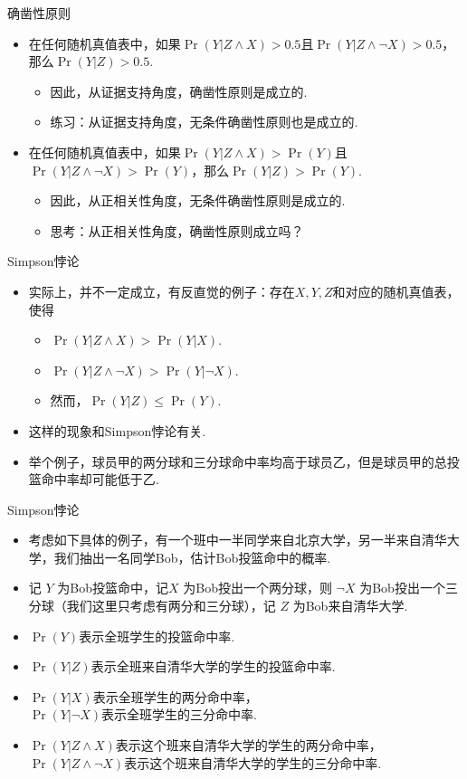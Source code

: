 \begin{frame}{确凿性原则}
\begin{itemize}
    \item 在任何随机真值表中，如果$\Pr(Y|Z\wedge X)>0.5$且$\Pr(Y|Z\wedge\neg X)>0.5$，那么$\Pr(Y|Z)>0.5$.
    \begin{itemize}
        \item 因此，从证据支持角度，确凿性原则是成立的.
        \item 练习：从证据支持角度，无条件确凿性原则也是成立的.
    \end{itemize}
    \item 在任何随机真值表中，如果$\Pr(Y|Z\wedge X)>\Pr(Y)$且$\Pr(Y|Z\wedge\neg X)>\Pr(Y)$，那么$\Pr(Y|Z)>\Pr(Y)$.
    \begin{itemize}
        \item 因此，从正相关性角度，无条件确凿性原则是成立的.
        \item 思考：从正相关性角度，确凿性原则成立吗？
    \end{itemize}

\end{itemize}
\end{frame}
\begin{frame}{Simpson悖论}
\begin{itemize}
    \item 实际上，并不一定成立，有反直觉的例子：存在$X, Y, Z$和对应的随机真值表，使得
    \begin{itemize}
        \item $\Pr(Y| Z\wedge X)>\Pr(Y|X)$.
        \item $\Pr(Y| Z \wedge \neg X)>\Pr(Y|\neg X)$.
        \item 然而，$\Pr(Y|Z)\le \Pr(Y)$.
    \end{itemize}
    \item 这样的现象和Simpson悖论有关. \item 举个例子，球员甲的两分球和三分球命中率均高于球员乙，但是球员甲的总投篮命中率却可能低于乙.
\end{itemize}
\end{frame}

\begin{frame}{Simpson悖论}
    \begin{itemize}
        \item 考虑如下具体的例子，有一个班中一半同学来自北京大学，另一半来自清华大学，我们抽出一名同学Bob，估计Bob投篮命中的概率.
        \item 记 $Y$ 为Bob投篮命中，记$X$ 为Bob投出一个两分球，则 $\neg X$ 为Bob投出一个三分球（我们这里只考虑有两分和三分球），记 $Z$ 为Bob来自清华大学.
        \item $\Pr(Y)$表示全班学生的投篮命中率.
        \item $\Pr(Y|Z)$表示全班来自清华大学的学生的投篮命中率.
        \item $\Pr(Y|X)$表示全班学生的两分命中率，\\$\Pr(Y|\neg X)$表示全班学生的三分命中率.
        \item $\Pr(Y|Z \wedge X)$表示这个班来自清华大学的学生的两分命中率，$\Pr(Y|Z \wedge \neg X)$表示这个班来自清华大学的学生的三分命中率.
    \end{itemize}  
\end{frame}

